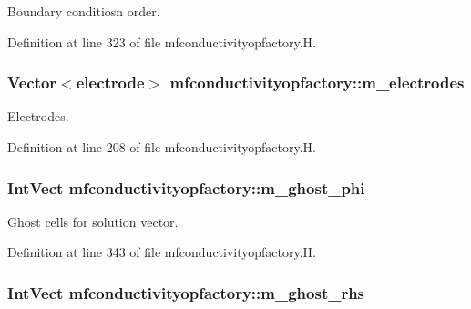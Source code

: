 Boundary conditiosn order. 



Definition at line 323 of file mfconductivityopfactory.\+H.

\subsubsection[{\texorpdfstring{m\+\_\+electrodes}{m_electrodes}}]{\setlength{\rightskip}{0pt plus 5cm}Vector$<${\bf electrode}$>$ mfconductivityopfactory\+::m\+\_\+electrodes\hspace{0.3cm}{\ttfamily [protected]}}\hypertarget{classmfconductivityopfactory_ac1418a8f71e5aadb90960d4e24bb7799}{}\label{classmfconductivityopfactory_ac1418a8f71e5aadb90960d4e24bb7799}


Electrodes. 



Definition at line 208 of file mfconductivityopfactory.\+H.

\subsubsection[{\texorpdfstring{m\+\_\+ghost\+\_\+phi}{m_ghost_phi}}]{\setlength{\rightskip}{0pt plus 5cm}Int\+Vect mfconductivityopfactory\+::m\+\_\+ghost\+\_\+phi\hspace{0.3cm}{\ttfamily [protected]}}\hypertarget{classmfconductivityopfactory_a4356fa0bb3aaa681629b5fdef69e9054}{}\label{classmfconductivityopfactory_a4356fa0bb3aaa681629b5fdef69e9054}


Ghost cells for solution vector. 



Definition at line 343 of file mfconductivityopfactory.\+H.

\subsubsection[{\texorpdfstring{m\+\_\+ghost\+\_\+rhs}{m_ghost_rhs}}]{\setlength{\rightskip}{0pt plus 5cm}Int\+Vect mfconductivityopfactory\+::m\+\_\+ghost\+\_\+rhs\hspace{0.3cm}{\ttfamily [protected]}}\hypertarget{classmfconductivityopfactory_a6e9283af244c45b42b084f3e9a3466b7}{}\label{classmfconductivityopfactory_a6e9283af244c45b42b084f3e9a3466b7}


